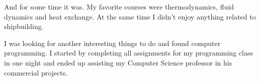 \documentclass[12pt]{letter}
\begin{document}
\begin{llist}
            \item And for some time it was. My favorite courses were thermodynamics, fluid dynamics and heat exchange. At the same time I didn't enjoy anything related to shipbuilding.

            \item I was looking for another interesting things to do and found computer programming. I started by completing all assignments for my programming class in one night and ended up assisting my Computer Science professor in his commercial projects.

  \endexperience

\end{llist}
\end{document}
